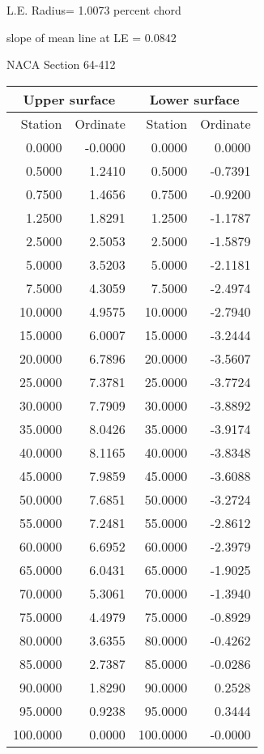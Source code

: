 \documentclass[11pt]{book}
\begin{document}
L.E. Radius=  1.0073 percent chord


 slope of mean line at LE =  0.0842
 \newpage
  \label{s64-412}
 \begin{Large}
 NACA Section 64-412
 \end{Large}
  
 \vspace{8mm}
 \begin{tabular}{|r|r|r|r|} \hline 
 \multicolumn{2}{|c|}{Upper surface} & \multicolumn{2}{|c|}{Lower surface} \\
 \hline
 Station & Ordinate & Station & Ordinate \\
 \hline
0.0000 & -0.0000 & 0.0000 & 0.0000 \\
0.5000 & 1.2410 & 0.5000 & -0.7391 \\
0.7500 & 1.4656 & 0.7500 & -0.9200 \\
1.2500 & 1.8291 & 1.2500 & -1.1787 \\
2.5000 & 2.5053 & 2.5000 & -1.5879 \\
5.0000 & 3.5203 & 5.0000 & -2.1181 \\
7.5000 & 4.3059 & 7.5000 & -2.4974 \\
10.0000 & 4.9575 & 10.0000 & -2.7940 \\
15.0000 & 6.0007 & 15.0000 & -3.2444 \\
20.0000 & 6.7896 & 20.0000 & -3.5607 \\
25.0000 & 7.3781 & 25.0000 & -3.7724 \\
30.0000 & 7.7909 & 30.0000 & -3.8892 \\
35.0000 & 8.0426 & 35.0000 & -3.9174 \\
40.0000 & 8.1165 & 40.0000 & -3.8348 \\
45.0000 & 7.9859 & 45.0000 & -3.6088 \\
50.0000 & 7.6851 & 50.0000 & -3.2724 \\
55.0000 & 7.2481 & 55.0000 & -2.8612 \\
60.0000 & 6.6952 & 60.0000 & -2.3979 \\
65.0000 & 6.0431 & 65.0000 & -1.9025 \\
70.0000 & 5.3061 & 70.0000 & -1.3940 \\
75.0000 & 4.4979 & 75.0000 & -0.8929 \\
80.0000 & 3.6355 & 80.0000 & -0.4262 \\
85.0000 & 2.7387 & 85.0000 & -0.0286 \\
90.0000 & 1.8290 & 90.0000 & 0.2528 \\
95.0000 & 0.9238 & 95.0000 & 0.3444 \\
100.0000 & 0.0000 & 100.0000 & -0.0000 \\
 \hline 
 \end{tabular}
\end{document}
